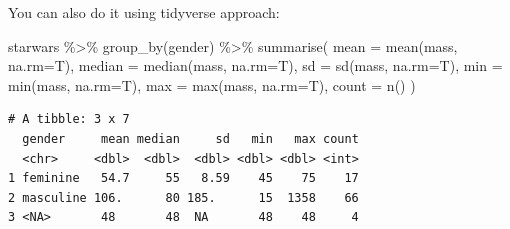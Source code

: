 \documentclass[
  ignorenonframetext,
]{beamer}
\newenvironment{Shaded}{\begin{snugshade}}{\end{snugshade}}
\newcommand{\AttributeTok}[1]{\textcolor[rgb]{0.40,0.45,0.13}{#1}}
\newcommand{\FunctionTok}[1]{\textcolor[rgb]{0.28,0.35,0.67}{#1}}
\newcommand{\NormalTok}[1]{\textcolor[rgb]{0.00,0.23,0.31}{#1}}
\newcommand{\SpecialCharTok}[1]{\textcolor[rgb]{0.37,0.37,0.37}{#1}}
\begin{document}
\begin{frame}[fragile]
You can also do it using tidyverse approach:

\begin{Shaded}
\begin{Highlighting}[]
\NormalTok{starwars }\SpecialCharTok{\%\textgreater{}\%}
  \FunctionTok{group\_by}\NormalTok{(gender) }\SpecialCharTok{\%\textgreater{}\%}
  \FunctionTok{summarise}\NormalTok{(}
    \AttributeTok{mean =} \FunctionTok{mean}\NormalTok{(mass, }\AttributeTok{na.rm=}\NormalTok{T),}
    \AttributeTok{median =} \FunctionTok{median}\NormalTok{(mass, }\AttributeTok{na.rm=}\NormalTok{T),}
    \AttributeTok{sd =} \FunctionTok{sd}\NormalTok{(mass, }\AttributeTok{na.rm=}\NormalTok{T),}
    \AttributeTok{min =} \FunctionTok{min}\NormalTok{(mass, }\AttributeTok{na.rm=}\NormalTok{T),}
    \AttributeTok{max =} \FunctionTok{max}\NormalTok{(mass, }\AttributeTok{na.rm=}\NormalTok{T),}
    \AttributeTok{count =} \FunctionTok{n}\NormalTok{()}
\NormalTok{  )}
\end{Highlighting}
\end{Shaded}

\begin{verbatim}
# A tibble: 3 x 7
  gender     mean median     sd   min   max count
  <chr>     <dbl>  <dbl>  <dbl> <dbl> <dbl> <int>
1 feminine   54.7     55   8.59    45    75    17
2 masculine 106.      80 185.      15  1358    66
3 <NA>       48       48  NA       48    48     4
\end{verbatim}
\end{frame}
\end{document}
